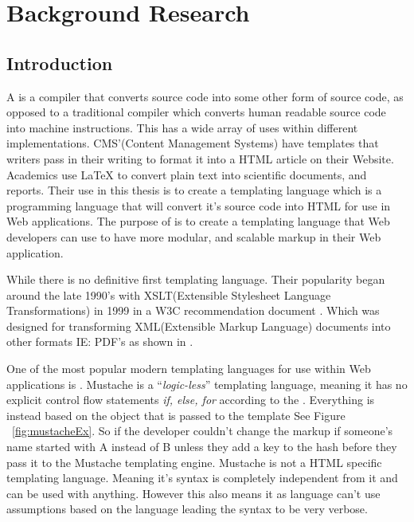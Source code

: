 \chapter{Background Research}
\section{Introduction}

A \compiler{}  is a compiler that converts source code into some other form of source code, as opposed to a traditional compiler which converts human readable source code into machine instructions. This has a wide array of uses within different implementations. CMS'(Content Management Systems) have templates that writers pass in their writing to format it into a HTML article on their Website. Academics use \LaTeX{} to convert plain text into scientific documents, and reports. Their use in this thesis is to create a templating language which is a programming language that will convert it's source code into HTML for use in Web applications. The purpose of \languageName{} is to create a templating language that Web developers can use to have more modular, and scalable markup in their Web application.

While there is no definitive first templating language. Their popularity began around the late 1990's with XSLT(Extensible Stylesheet Language Transformations) in 1999 in a W3C recommendation document \parencite{XSLT}. Which was designed for transforming XML(Extensible Markup Language) documents into other formats IE: PDF's as shown in \parencite{XSLTEx}.
\newpage 

One of the most popular modern templating languages for use within Web applications is \parencite{Mustache}. Mustache is a ``\textit{logic-less}'' templating language, meaning it has no explicit control flow statements \textit{if, else, for} according to the \parencite{MustacheMan}. Everything is instead based on the object that is passed to the template See Figure ~\ref{fig:mustacheEx}. So if the developer couldn't change the markup if someone's name started with A instead of B unless they add a key to the hash before they pass it to the Mustache templating engine. Mustache is not a HTML specific templating language. Meaning it's syntax is completely independent from it and can be used with anything. However this also means it as language can't use assumptions based on the language leading the syntax to be very verbose. 


